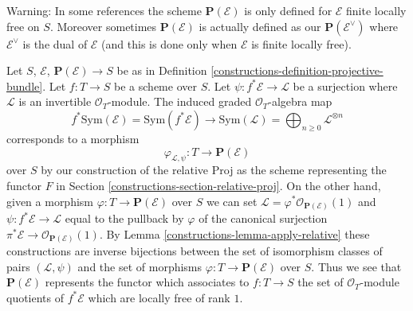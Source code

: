 \medskip\noindent
Warning: In some references the scheme $\mathbf{P}(\mathcal{E})$
is only defined for $\mathcal{E}$ finite locally free on $S$.
Moreover sometimes $\mathbf{P}(\mathcal{E})$ is actually defined as our
$\mathbf{P}(\mathcal{E}^\vee)$ where $\mathcal{E}^\vee$
is the dual of $\mathcal{E}$ (and this is done only when $\mathcal{E}$ is
finite locally free).

\medskip\noindent
Let $S$, $\mathcal{E}$, $\mathbf{P}(\mathcal{E}) \to S$ be as in
Definition \ref{constructions-definition-projective-bundle}. Let $f : T \to S$
be a scheme over $S$. Let $\psi : f^*\mathcal{E} \to \mathcal{L}$
be a surjection where $\mathcal{L}$ is an invertible $\mathcal{O}_T$-module.
The induced graded $\mathcal{O}_T$-algebra map
$$
f^*\text{Sym}(\mathcal{E}) = \text{Sym}(f^*\mathcal{E}) \to
\text{Sym}(\mathcal{L}) = \bigoplus\nolimits_{n \geq 0} \mathcal{L}^{\otimes n}
$$
corresponds to a morphism
$$
\varphi_{\mathcal{L}, \psi} : T \longrightarrow \mathbf{P}(\mathcal{E})
$$
over $S$ by our construction of the relative Proj as the scheme representing
the functor $F$ in Section \ref{constructions-section-relative-proj}. On the other hand,
given a morphism $\varphi : T \to \mathbf{P}(\mathcal{E})$ over $S$
we can set $\mathcal{L} = \varphi^*\mathcal{O}_{\mathbf{P}(\mathcal{E})}(1)$
and $\psi : f^*\mathcal{E} \to \mathcal{L}$ equal to the pullback
by $\varphi$ of the canonical surjection
$\pi^*\mathcal{E} \to \mathcal{O}_{\mathbf{P}(\mathcal{E})}(1)$.
By Lemma \ref{constructions-lemma-apply-relative} these constructions
are inverse bijections between the set of isomorphism classes of pairs
$(\mathcal{L}, \psi)$ and the set of morphisms
$\varphi : T \to \mathbf{P}(\mathcal{E})$ over $S$.
Thus we see that $\mathbf{P}(\mathcal{E})$ represents the functor
which associates to $f : T \to S$ the set of $\mathcal{O}_T$-module
quotients of $f^*\mathcal{E}$ which are locally free of rank $1$.


